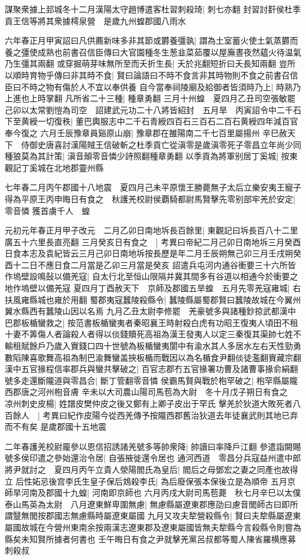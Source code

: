 謀聚衆據上邽城冬十二月漢陽太守趙博遣客杜習刺殺琦|{
	刺七亦翻}
封習討姧侯杜季貢王信等將其衆據樗泉營　是歲九州蝗郡國八雨水

六年春正月甲寅詔曰凡供薦新味多非其節或欝養彊孰|{
	謂為土室蓄火使土氣蒸欝而養之彊使成熟也前書召信臣傳曰大官園種冬生葱韭菜茹覆以屋廡晝夜然藴火待温氣乃生彊其兩翻}
或穿掘萌芽味無所至而夭折生長|{
	夭於兆翻短折曰夭長知兩翻}
豈所以順時育物乎傳曰非其時不食|{
	賢曰論語曰不時不食言非其時物則不食之前書召信臣曰不時之物有傷於人不宜以奉供養}
自今當奉祠陵廟及給御者皆須時乃上|{
	時熟乃上進也上時掌翻}
凡所省二十三種|{
	種章勇翻}
三月十州蝗　夏四月乙丑司空張敏罷　己卯以太常劉愷為司空　詔建武元功二十八將皆紹封　五月旱　丙寅詔令中二千石下至黄綬一切復秩|{
	董巴輿服志中二千石青綬四百石三百石二百石黄綬四年減百官奉今復之}
六月壬辰豫章員谿原山崩|{
	豫章郡在雒陽南二千七百里屬揚州}
辛巳赦天下　侍御史唐喜討漢陽賊王信破斬之杜季貢亡從滇零是歲滇零死子零昌立年尚少同種狼莫為其計策|{
	滇音顛零音憐少詩照翻種章勇翻}
以季貢為將軍别居丁奚城|{
	按東觀記丁奚城在北地郡靈州縣}


七年春二月丙午郡國十八地震　夏四月己未平原懷王勝薨無子太后立樂安夷王寵子得為平原王丙申晦日有食之　秋護羌校尉侯覇騎都尉馬賢擊先零别部牢羌於安定|{
	零音憐}
獲首虜千人　蝗

元初元年春正月甲子改元　二月乙卯日南地坼長百餘里|{
	東觀記曰坼長百八十二里廣五十六里長直亮翻}
三月癸亥日有食之　|{
	考異曰帝紀二月己卯日南地坼三月癸酉日食本志及袁紀皆云三月己卯日南地坼按長歷是年二月壬辰朔無己卯三月壬戌朔癸酉十二日不應日食二月當是乙卯三月當是癸亥}
詔遣兵屯河内通谷衝要三十六所皆作塢壁設鳴鼔以備羌寇|{
	自太行北至恒山限隔并冀其間多有谷道以相通今於衝要之地作塢壁以備羌寇}
夏四月丁酉赦天下　京師及郡國五旱蝗　五月先零羌寇雍城|{
	右扶風雍縣城也雍於用翻}
蜀郡夷寇蠶陵殺縣令|{
	蠶陵縣屬蜀郡賢曰蠶陵故城在今翼州翼水縣西有蠶陵山因以名焉}
九月乙丑太尉李修罷　羌豪號多與諸種鈔掠武都漢中巴郡板楯蠻救之|{
	按范書板楯蠻夷者秦昭襄王時射殺白虎有功昭王復夷人頃田不租十妻不筭傷人者論殺人者得以倓錢贖死高祖為漢王發夷人以定三秦復其渠帥七姓不輸租賦餘戶乃歲入賨錢口四十世號為板楯蠻夷閬中有渝水其人多居水左右天性勁勇數䧟陳喜歌舞高祖為制巴渝舞蠻盖挾板楯而戰因以為名楯食尹翻倓徒濫翻賨藏宗翻}
漢中五官掾程信率郡兵與蠻共擊破之|{
	百官志郡冇五官掾署功曹及諸曹事掾俞絹翻}
號多走還斷隴道與零昌合|{
	斷丁管翻零音憐}
侯霸馬賢與戰於枹罕破之|{
	枹罕縣屬隴西郡唐之河州枹音膚}
辛未以大司農山陽司馬苞為大尉　冬十月戊子朔日有食之　凉州刺史皮楊|{
	姓譜皮樊仲皮之後又鄭有上卿子皮出于罕氏}
擊羌於狄道大敗死者八百餘人　|{
	考異曰紀作皮陽今從西羌傳予按隴西郡舊治狄道去年徒襄武則其地已弃而不有矣}
是歲郡國十五地震

二年春護羌校尉龎參以恩信招誘諸羌號多等帥衆降|{
	帥讀曰率降戶江翻}
參遣詣闕賜號多侯印遣之參始還治令居|{
	自張掖徙還令居也}
通河西道　零昌分兵寇益州遣中郎將尹就討之　夏四月丙午立貴人滎陽閻氏為皇后|{
	閻后之母鄧宏之妻之同產也故得立}
后性妬忌後宫李氏生皇子保后鴆殺李氏|{
	為后廢保張本保後立是為順帝}
五月京師旱河南及郡國十九蝗|{
	河南即京師也}
六月丙戌大尉司馬苞薨　秋七月辛巳以太僕泰山馬英為太尉　八月遼東鮮卑圍無慮|{
	無慮縣屬遼東郡應劭曰慮音閭師古曰即所謂毉無閭按郡國志無慮縣時屬遼東屬國}
九月又攻夫犂營殺縣令|{
	賢曰夫犂縣屬遼東屬國故城在今營州東南余按兩漢志遼東郡及遼東屬國皆無夫犂縣今言殺縣令則嘗為縣矣未知賢所據者何書也}
壬午晦日有食之尹就擊羌黨呂叔都等蜀人陳省羅横應募刺殺叔

